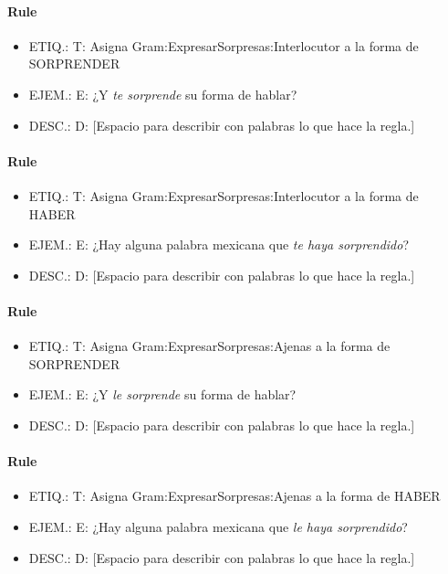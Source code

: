 \documentclass[11pt]{report}
\begin{document}
\paragraph*{Rule}
\begin{itemize}
\item ETIQ.:  T: Asigna Gram:ExpresarSorpresas:Interlocutor a la forma de SORPRENDER
\item EJEM.:  E: ¿Y \emph{te sorprende} su forma de hablar?
\item DESC.:  D: [Espacio para describir con palabras lo que hace la regla.]
\end{itemize}

\paragraph*{Rule}
\begin{itemize}
\item ETIQ.:  T: Asigna Gram:ExpresarSorpresas:Interlocutor a la forma de HABER
\item EJEM.:  E: ¿Hay alguna palabra mexicana que \emph{te haya sorprendido}?
\item DESC.:  D: [Espacio para describir con palabras lo que hace la regla.]
\end{itemize}

\paragraph*{Rule}
\begin{itemize}
\item ETIQ.:  T: Asigna Gram:ExpresarSorpresas:Ajenas a la forma de SORPRENDER
\item EJEM.:  E: ¿Y \emph{le sorprende} su forma de hablar?
\item DESC.:  D: [Espacio para describir con palabras lo que hace la regla.]
\end{itemize}

\paragraph*{Rule}
\begin{itemize}
\item ETIQ.:  T: Asigna Gram:ExpresarSorpresas:Ajenas a la forma de HABER
\item EJEM.:  E: ¿Hay alguna palabra mexicana que \emph{le haya sorprendido}?
\item DESC.:  D: [Espacio para describir con palabras lo que hace la regla.]
\end{itemize}
\end{document}
